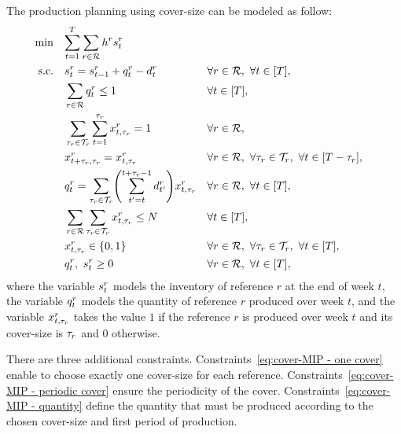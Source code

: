 The production planning using cover-size can be modeled as follow:
\begin{subequations}\label{eq:cover-MIP}
  \begin{align}
    \min\quad & \rlap{$\ds \sum_{t=1}^{\horizon} \sum_{r\in\REF} \holding^r \inventory_t^r$}
    \label{eq:cover-MIP - objective}
    \\
    \st\quad & \ds \inventory_t^r = \inventory_{t-1}^r + \quantity_t^r - \demand_t^r && \forall r\in\REF,\ \forall t\in\range{\horizon},
    \label{eq:cover-MIP - stock dynamics}
    \\
    & \ds \sum_{r\in\REF} \quantity_t^r \le 1 && \forall t\in\range{\horizon},
    \label{eq:cover-MIP - total capacity}
    \\
    & \ds \sum_{\cover_r\in\coverset_r} \sum_{t=1}^{\cover_r} \setup_{t,\cover_r}^r = 1 && \forall r\in\REF,
    \label{eq:cover-MIP - one cover}
    \\
    & \ds \setup_{t+\cover_r,\cover_r}^r = \setup_{t,\cover_r}^r && \forall r\in\REF,\ \forall \cover_r\in\coverset_r,\ \forall t\in\range{\horizon-\cover_r},
    \label{eq:cover-MIP - periodic cover}
    \\
    & \ds \quantity_t^r = \sum_{\cover_r\in\coverset_r} \bracket{\sum_{t'=t}^{t+\cover_r-1}\demand_{t'}^r} \setup_{t,\cover_r}^r  && \forall r\in\REF,\ \forall t\in\range{\horizon},
    \label{eq:cover-MIP - quantity}
    \\
    & \ds \sum_{r\in\REF} \sum_{\cover_r\in\coverset_r} \setup_{t,\cover_r}^r \le \nbsetups && \forall t\in\range{\horizon},
    \label{eq:cover-MIP - setups per period}
    \\
    & \ds \setup_{t,\cover_r}^r \in \crbracket{0,1} && \forall r\in\REF,\ \forall \cover_r\in\coverset_r,\ \forall t\in\range{\horizon},
    \label{eq:cover-MIP - boolean constraint}
    \\
    & \ds \quantity_t^r,\ \inventory_t^r \ge 0 && \forall r\in\REF,\ \forall t\in\range{\horizon},
    \label{eq:cover-MIP - positive}
  \end{align}
\end{subequations}
where the variable $s_t^r$ models the inventory of reference $r$ at the end of week $t$, the variable $q_t^r$ models the quantity of reference $r$ produced over week $t$, and the variable $x_{t,\tau_r}^r$ takes the value $1$ if the reference $r$ is produced over week $t$ and its cover-size is $\tau_r$ and $0$ otherwise.

There are three additional constraints.
Constraints~\eqref{eq:cover-MIP - one cover} enable to choose exactly one cover-size for each reference.
Constraints~\eqref{eq:cover-MIP - periodic cover} ensure the periodicity of the cover.
Constraints~\eqref{eq:cover-MIP - quantity} define the quantity that must be produced according to the chosen cover-size and first period of production.


